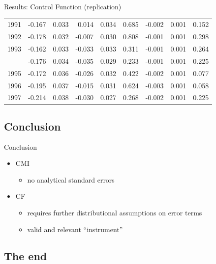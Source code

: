 \documentclass[10pt,ignorenonframetext,]{beamer}
\providecommand{\tightlist}{%
  \setlength{\itemsep}{0pt}\setlength{\parskip}{0pt}}
\begin{document}
\begin{frame}{Results: Control Function (replication)}
\begin{longtable}[t]{rrrrrrrrr}
1991 & -0.167 & 0.033 & 0.014 & 0.034 & 0.685 & -0.002 & 0.001 & 0.152\\
1992 & -0.178 & 0.032 & -0.007 & 0.030 & 0.808 & -0.001 & 0.001 & 0.298\\
1993 & -0.162 & 0.033 & -0.033 & 0.033 & 0.311 & -0.001 & 0.001 & 0.264\\
\addlinespace
1994 & -0.176 & 0.034 & -0.035 & 0.029 & 0.233 & -0.001 & 0.001 & 0.225\\
1995 & -0.172 & 0.036 & -0.026 & 0.032 & 0.422 & -0.002 & 0.001 & 0.077\\
1996 & -0.195 & 0.037 & -0.015 & 0.031 & 0.624 & -0.003 & 0.001 & 0.058\\
1997 & -0.214 & 0.038 & -0.030 & 0.027 & 0.268 & -0.002 & 0.001 & 0.225\\*
\end{longtable}\endgroup{}

\end{frame}

\hypertarget{conclusion}{%
\subsection{Conclusion}\label{conclusion}}

\begin{frame}{Conclusion}
\protect\hypertarget{conclusion-1}{}

\begin{itemize}
\tightlist
\item
  CMI

  \begin{itemize}
  \tightlist
  \item
    no analytical standard errors
  \end{itemize}
\item
  CF

  \begin{itemize}
  \tightlist
  \item
    requires further distributional assumptions on error terms
  \item
    valid and relevant ``instrument''
  \end{itemize}
\end{itemize}

\end{frame}

\hypertarget{the-end}{%
\subsection{The end}\label{the-end}}
\end{document}
